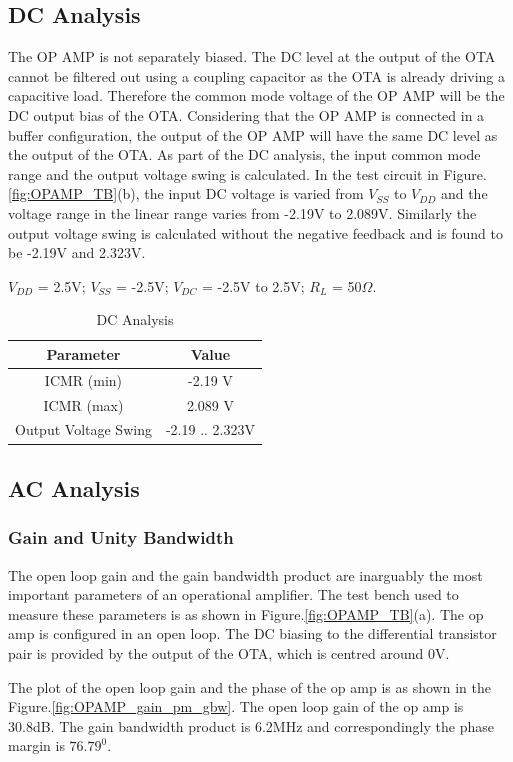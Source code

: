\subsection{DC Analysis}
The OP AMP is not separately biased. The DC level at the output of the OTA cannot be filtered out using a coupling capacitor as the OTA is already driving a capacitive load. Therefore the common mode voltage of the OP AMP will be the DC output bias of the OTA. Considering that the OP AMP is connected in a buffer configuration, the output of the OP AMP will have the same DC level as the output of the OTA. As part of the DC analysis, the input common mode range and the output voltage swing is calculated. In the test circuit in Figure.\ref{fig:OPAMP_TB}(b), the input DC voltage is varied from $V_{SS}$ to $V_{DD}$ and the voltage range in the linear range varies from -2.19V to 2.089V. Similarly the output voltage swing is calculated without the negative feedback and is found to be -2.19V and 2.323V.

$V_{DD}$ = 2.5V; $V_{SS}$ = -2.5V; $V_{DC}$ = -2.5V to 2.5V; $R_L$ = 50$\Omega$.
\begin{table} [H]
\centering
\begin{tabular}{@{}cc@{}}
\toprule
Parameter					& Value				\\ \midrule
ICMR (min)					& -2.19 V			\\
ICMR (max)					& 2.089 V			\\
Output Voltage Swing		& -2.19 .. 2.323V	\\
\bottomrule
\end{tabular}
\caption{DC Analysis}
\label{tab:OPAMP_DC}
\end{table}

\subsection{AC Analysis}
\subsubsection{Gain and Unity Bandwidth}
The open loop gain and the gain bandwidth product are inarguably the most important parameters of an operational amplifier. The test bench used to measure these parameters is as shown in Figure.\ref{fig:OPAMP_TB}(a). The op amp is configured in an open loop. The DC biasing to the differential transistor pair is provided by the output of the OTA, which is centred around 0V. 

The plot of the open loop gain and the phase of the op amp is as shown in the Figure.\ref{fig:OPAMP_gain_pm_gbw}. The open loop gain of the op amp is 30.8dB. The gain bandwidth product is 6.2MHz and correspondingly the phase margin is $76.79^0$.


